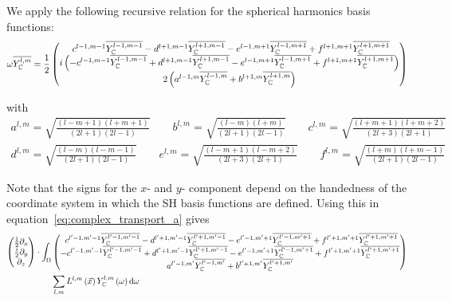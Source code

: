 \documentclass[10pt]{scrartcl}
\begin{document}
We apply the following recursive relation for the spherical harmonics basis functions:
\begin{align}
\omega\overline{Y_{\mathbb{C}}^{l,m}} = \frac{1}{2}
\begin{pmatrix}
\ c^{l-1, m-1}\overline{Y_{\mathbb{C}}^{l-1,m-1}} - d^{l+1, m-1}\overline{Y_{\mathbb{C}}^{l+1,m-1}} - e^{l-1, m+1}\overline{Y_{\mathbb{C}}^{l-1,m+1}} + f^{l+1, m+1}\overline{Y_{\mathbb{C}}^{l+1,m+1}}\\
i\left(-c^{l-1, m-1}\overline{Y_{\mathbb{C}}^{l-1,m-1}} + d^{l+1, m-1}\overline{Y_{\mathbb{C}}^{l+1,m-1}} - e^{l-1, m+1}\overline{Y_{\mathbb{C}}^{l-1,m+1}} + f^{l+1, m+1}\overline{Y_{\mathbb{C}}^{l+1,m+1}}\right) \\
2\left(a^{l-1, m}\overline{Y_{\mathbb{C}}^{l-1,m}}+b^{l+1, m}\overline{Y_{\mathbb{C}}^{l+1,m}}\right)
\end{pmatrix}
\label{eq:recursive_relation}
\end{align}

with 
\begin{align*}
a^{l,m}= \sqrt{\frac{\left(l-m+1\right)\left(l+m+1\right)}{\left(2l+1\right)\left(2l-1\right)}} \qquad
b^{l,m}= \sqrt{\frac{\left(l-m\right)\left(l+m\right)}{\left(2l+1\right)\left(2l-1\right)}} \qquad
c^{l,m}= \sqrt{\frac{\left(l+m+1\right)\left(l+m+2\right)}{\left(2l+3\right)\left(2l+1\right)}}\\
d^{l,m}= \sqrt{\frac{\left(l-m\right)\left(l-m-1\right)}{\left(2l+1\right)\left(2l-1\right)}} \qquad
e^{l,m}= \sqrt{\frac{\left(l-m+1\right)\left(l-m+2\right)}{\left(2l+3\right)\left(2l+1\right)}} \qquad
f^{l,m}= \sqrt{\frac{\left(l+m\right)\left(l+m-1\right)}{\left(2l+1\right)\left(2l-1\right)}}
\end{align*}

Note that the signs for the $x$- and $y$- component depend on the handedness of the coordinate system in which the SH basis functions are defined. Using this in equation~\ref{eq:complex_transport_a} gives
\begin{align*}
\begin{pmatrix}
\frac{1}{2}\partial_x\\
\frac{i}{2}\partial_y\\
\partial_z
\end{pmatrix}
\cdot
\int_\Omega
&
\begin{pmatrix}
\ c^{l'-1, m'-1}\overline{Y_{\mathbb{C}}^{l'-1,m'-1}} - d^{l'+1, m'-1}\overline{Y_{\mathbb{C}}^{l'+1,m'-1}} - e^{l'-1, m'+1}\overline{Y_{\mathbb{C}}^{l'-1,m'+1}} + f^{l'+1, m'+1}\overline{Y_{\mathbb{C}}^{l'+1,m'+1}}\\
-c^{l'-1, m'-1}\overline{Y_{\mathbb{C}}^{l'-1,m'-1}} + d^{l'+1, m'-1}\overline{Y_{\mathbb{C}}^{l'+1,m'-1}} - e^{l'-1, m'+1}\overline{Y_{\mathbb{C}}^{l'-1,m'+1}} + f^{l'+1, m'+1}\overline{Y_{\mathbb{C}}^{l'+1,m'+1}} \\
a^{l'-1, m'}\overline{Y_{\mathbb{C}}^{l'-1,m'}}+b^{l'+1, m'}\overline{Y_{\mathbb{C}}^{l'+1,m'}}
\end{pmatrix}
\\
&\sum_{l,m}{
L^{l,m}\left(\vec{x}\right )Y_{\mathbb{C}}^{l,m}\left(\omega\right)
}
\,\mathrm{d}\omega
\end{align*}
\end{document}
